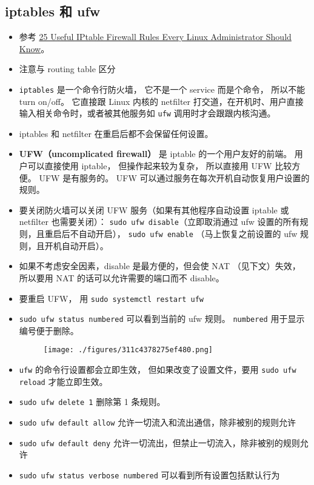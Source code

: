 \subsection{iptables 和 ufw}
\begin{itemize}
\item 参考 \href{https://www.tecmint.com/linux-iptables-firewall-rules-examples-commands/}{25 Useful IPtable Firewall Rules Every Linux Administrator Should Know}。
\item 注意与 routing table 区分
\item \verb|iptables| 是一个命令行防火墙， 它不是一个 service 而是个命令， 所以不能 turn on/off。 它直接跟 Linux 内核的 netfilter 打交道，在开机时、用户直接输入相关命令时，或者被其他服务如 \verb`ufw` 调用时才会跟跟内核沟通。
\item iptables 和 netfilter 在重启后都不会保留任何设置。
\item \textbf{UFW（uncomplicated firewall）} 是 iptable 的一个用户友好的前端。 用户可以直接使用 iptable， 但操作起来较为复杂， 所以直接用 UFW 比较方便。 UFW 是有服务的。 UFW 可以通过服务在每次开机自动恢复用户设置的规则。
\item 要关闭防火墙可以关闭 UFW 服务（如果有其他程序自动设置 iptable 或 netfilter 也需要关闭）： \verb|sudo ufw disable|（立即取消通过 ufw 设置的所有规则，且重启后不自动开启）， \verb|sudo ufw enable| （马上恢复之前设置的 ufw 规则，且开机自动开启）。
\item 如果不考虑安全因素，disable 是最方便的，但会使 NAT （见下文）失效， 所以要用 NAT 的话可以允许需要的端口而不 disable。
\item 要重启 UFW， 用 \verb|sudo systemctl restart ufw|
\item \verb`sudo ufw status numbered` 可以看到当前的 ufw 规则。 \verb`numbered` 用于显示编号便于删除。
\begin{figure}[ht]
\centering
\texttt{[image: ./figures/311c4378275ef480.png]}
\caption{} \label{fig_LinWeb_2}
\end{figure}
\item \verb`ufw` 的命令行设置都会立即生效， 但如果改变了设置文件，要用 \verb`sudo ufw reload` 才能立即生效。
\item \verb`sudo ufw delete 1` 删除第 1 条规则。
\item \verb`sudo ufw default allow` 允许一切流入和流出通信，除非被别的规则允许
\item \verb`sudo ufw default deny` 允许一切流出，但禁止一切流入，除非被别的规则允许
\item \verb`sudo ufw status verbose numbered` 可以看到所有设置包括默认行为

\end{itemize}
